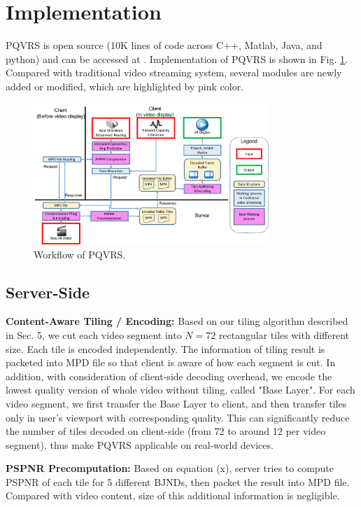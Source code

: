 \section{Implementation}

PQVRS is open source (10K lines of code across C++, Matlab, Java, and python) and can be accessed at \cite{github}. Implementation of PQVRS is shown in Fig. \ref{implementation}. Compared with traditional video streaming system, several modules are newly added or modified, which are highlighted by pink color.

\begin{figure}
  \centering
  \includegraphics[width=3.5in]{images/implementation.pdf}
  \caption{Workflow of PQVRS.}
  \label{implementation}
  \end{figure}

\subsection{Server-Side}

\textbf{Content-Aware Tiling / Encoding:} Based on our tiling algorithm described in Sec. 5, we cut each video segment into $N = 72$ rectangular tiles with different size. Each tile is encoded independently. The information of tiling result is packeted into MPD file so that client is aware of how each segment is cut. In addition, with consideration of client-side decoding overhead, we encode the lowest quality version of whole video without tiling, called "Base Layer". For each video segment, we first transfer the Base Layer to client, and then transfer tiles only in user's viewport with corresponding quality. This can significantly reduce the number of tiles decoded on client-side (from 72 to around 12 per video segment), thus make PQVRS applicable on real-world devices.

\textbf{PSPNR Precomputation:} Based on equation (x), server tries to compute PSPNR of each tile for 5 different BJNDs, then packet the result into MPD file. Compared with video content, size of this additional information is negligible.

